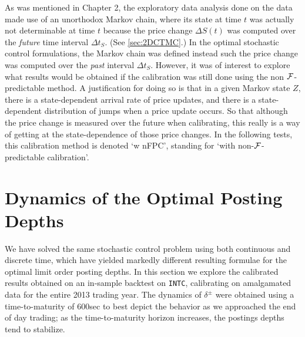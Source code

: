 As was mentioned in Chapter 2, the exploratory data analysis done on the data made use of an unorthodox Markov chain, where its state at time $t$ was actually not determinable at time $t$ because the price change $\Delta S(t)$ was computed over the \emph{future} time interval $\Delta t_S$. (See \autoref{sec:2DCTMC}.) In the optimal stochastic control formulations, the Markov chain was defined instead such the price change was computed over the \emph{past} interval $\Delta t_S$. However, it was of interest to explore what results would be obtained if the calibration was still done using the non $\mathcal{F}$-predictable method. A justification for doing so is that in a given Markov state $Z$, there is a state-dependent arrival rate of price updates, and there is a state-dependent distribution of jumps when a price update occurs. So that although the price change is measured over the future when calibrating, this really is a way of getting at the state-dependence of those price changes. In the following tests, this calibration method is denoted `w nFPC', standing for `with non-$\mathcal{F}$-predictable calibration'.

\section{Dynamics of the Optimal Posting Depths}

We have solved the same stochastic control problem using both continuous and discrete time, which have yielded markedly different resulting formulae for the optimal limit order posting depths. In this section we explore the calibrated results obtained on an in-sample backtest on \texttt{INTC}, calibrating on amalgamated data for the entire 2013 trading year. The dynamics of $\delta^\pm$ were obtained using a time-to-maturity of 600sec to best depict the behavior as we approached the end of day trading; as the time-to-maturity horizon increases, the postings depths tend to stabilize. 


